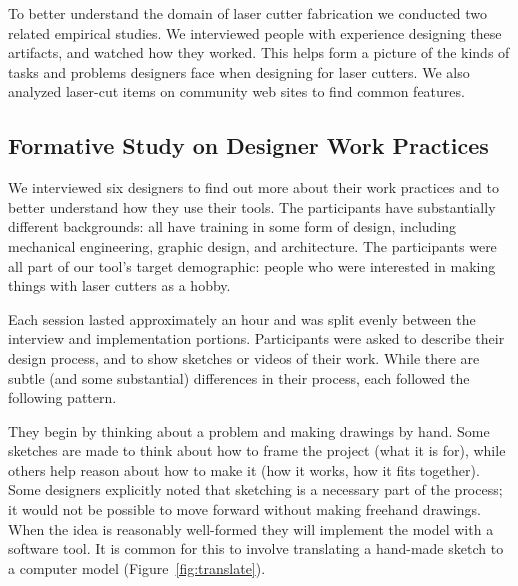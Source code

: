 \documentclass{article}
\begin{document}
To better understand the domain of laser cutter fabrication we
conducted two related empirical studies. We interviewed people with
experience designing these artifacts, and watched how they
worked. This helps form a picture of the kinds of tasks and problems
designers face when designing for laser cutters. We also analyzed
laser-cut items on community web sites to find common features.

\subsection{Formative Study on Designer Work Practices}
\label{sec:formative}

We interviewed six designers to find out more about their work
practices and to better understand how they use their tools. The
participants have substantially different backgrounds: all have
training in some form of design, including mechanical engineering,
graphic design, and architecture. The participants were all part of
our tool's target demographic: people who were interested in making
things with laser cutters as a hobby. 

Each session lasted approximately an hour and was split evenly between
the interview and implementation portions. Participants were asked to
describe their design process, and to show sketches or videos of their
work. While there are subtle (and some substantial) differences in
their process, each followed the following pattern.

They begin by thinking about a problem and making drawings by
hand. Some sketches are made to think about how to frame the project
(what it is for), while others help reason about how to make it (how
it works, how it fits together). Some designers explicitly noted that
sketching is a necessary part of the process; it would not be possible
to move forward without making freehand drawings. When the idea is
reasonably well-formed they will implement the model with a software
tool. It is common for this to involve translating a hand-made sketch
to a computer model (Figure~\ref{fig:translate}).
\end{document}
